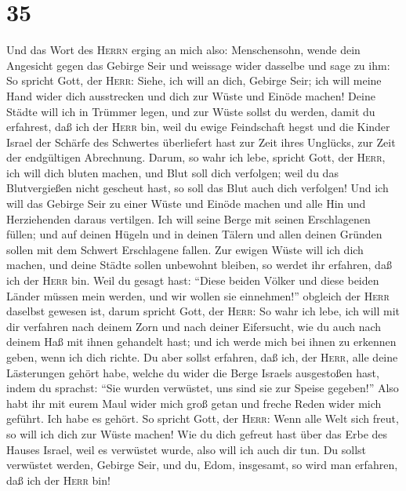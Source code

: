 \hypertarget{section-34}{%
\section{35}\label{section-34}}

 Und das Wort des \textsc{Herrn} erging an mich also:
 Menschensohn, wende dein Angesicht gegen das Gebirge Seir
und weissage wider dasselbe und sage zu ihm:  So spricht
Gott, der \textsc{Herr}: Siehe, ich will an dich, Gebirge Seir; ich will
meine Hand wider dich ausstrecken und dich zur Wüste und Einöde machen!
 Deine Städte will ich in Trümmer legen, und zur Wüste
sollst du werden, damit du erfahrest, daß ich der \textsc{Herr} bin,
 weil du ewige Feindschaft hegst und die Kinder Israel der
Schärfe des Schwertes überliefert hast zur Zeit ihres Unglücks, zur Zeit
der endgültigen Abrechnung.  Darum, so wahr ich lebe,
spricht Gott, der \textsc{Herr}, ich will dich bluten machen, und Blut
soll dich verfolgen; weil du das Blutvergießen nicht gescheut hast, so
soll das Blut auch dich verfolgen!  Und ich will das
Gebirge Seir zu einer Wüste und Einöde machen und alle Hin und
Herziehenden daraus vertilgen.  Ich will seine Berge mit
seinen Erschlagenen füllen; und auf deinen Hügeln und in deinen Tälern
und allen deinen Gründen sollen mit dem Schwert Erschlagene fallen.
 Zur ewigen Wüste will ich dich machen, und deine Städte
sollen unbewohnt bleiben, so werdet ihr erfahren, daß ich der
\textsc{Herr} bin.  Weil du gesagt hast: ``Diese beiden
Völker und diese beiden Länder müssen mein werden, und wir wollen sie
einnehmen!'' obgleich der \textsc{Herr} daselbst gewesen ist,
 darum spricht Gott, der \textsc{Herr}: So wahr ich lebe,
ich will mit dir verfahren nach deinem Zorn und nach deiner Eifersucht,
wie du auch nach deinem Haß mit ihnen gehandelt hast; und ich werde mich
bei ihnen zu erkennen geben, wenn ich dich richte.  Du
aber sollst erfahren, daß ich, der \textsc{Herr}, alle deine Lästerungen
gehört habe, welche du wider die Berge Israels ausgestoßen hast, indem
du sprachst: ``Sie wurden verwüstet, uns sind sie zur Speise gegeben!''
 Also habt ihr mit eurem Maul wider mich groß getan und
freche Reden wider mich geführt. Ich habe es gehört.  So
spricht Gott, der \textsc{Herr}: Wenn alle Welt sich freut, so will ich
dich zur Wüste machen!  Wie du dich gefreut hast über das
Erbe des Hauses Israel, weil es verwüstet wurde, also will ich auch dir
tun. Du sollst verwüstet werden, Gebirge Seir, und du, Edom, insgesamt,
so wird man erfahren, daß ich der \textsc{Herr} bin!

